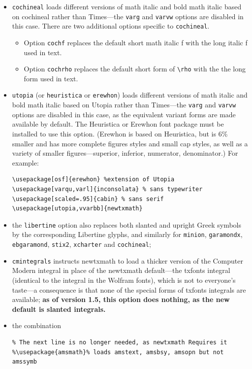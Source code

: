 \documentclass[11pt]{article}
\theoremstyle{oldplain}
\theoremstyle{plain}
\begin{document}
\begin{itemize}
\item {\tt cochineal}  loads different versions of math italic and bold math italic based on \textsf{cochineal} rather than \textsf{Times}---the {\tt varg} and {\tt varvw} options are disabled in this case. There are two additional options specific to {\tt cochineal}.
\begin{itemize}
\item
Option {\tt cochf} replaces the default short math italic f with the long italic f used in text.
\item Option {\tt cochrho} replaces the default short form of \verb|\rho| with the the long form used in text.
\end{itemize}
\item {\tt utopia} (or {\tt heuristica} or {\tt erewhon}) loads different versions of math italic and bold math italic based on \textsf{Utopia} rather than \textsf{Times}---the {\tt varg} and {\tt varvw} options are disabled in this case, as the equivalent variant forms are made available by default. The Heuristica or Erewhon font package must be installed to use this option. (Erewhon is based on Heuristica, but is 6\% smaller and has more complete figures styles and small cap styles, as well as a variety of smaller figures---superior, inferior, numerator, denominator.)  For example:
\begin{verbatim}
\usepackage[osf]{erewhon} %extension of Utopia
\usepackage[varqu,varl]{inconsolata} % sans typewriter
\usepackage[scaled=.95]{cabin} % sans serif
\usepackage[utopia,vvarbb]{newtxmath}
\end{verbatim}
\item the {\tt libertine} option also replaces both slanted and upright Greek  symbols by the corresponding Libertine glyphs, and similarly for {\tt minion}, {\tt garamondx}, {\tt ebgaramond}, {\tt stix2}, {\tt xcharter} and {\tt cochineal};
\item
{\tt cmintegrals} instructs \textsf{newtxmath} to load a thicker version of the Computer Modern integral in place of the \textsf{newtxmath} default---the txfonts integral (identical to the integral in the Wolfram fonts), which is not to everyone's taste---a consequence is that none of the special forms of \textsf{txfonts} integrals are available;
\textbf{as of version 1.5, this option does nothing, as the new default is slanted integrals.}
\item the combination
\begin{verbatim}
% The next line is no longer needed, as newtxmath Requires it
%\usepackage{amsmath}% loads amstext, amsbsy, amsopn but not amssymb

\end{verbatim}
\end{itemize}
\end{document}
